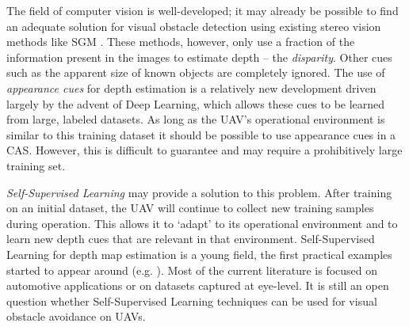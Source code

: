 \medskip

The field of computer vision is well-developed; it may already be possible to find an adequate solution for visual obstacle detection using existing stereo vision methods like \ac{SGM} \cite{Hirschmuller2008}.
These methods, however, only use a fraction of the information present in the images to estimate depth -- the \emph{disparity}.
Other cues such as the apparent size of known objects are completely ignored.
The use of \emph{appearance cues} for depth estimation is a relatively new development driven largely by the advent of Deep Learning, which allows these cues to be learned from large, labeled datasets.
As long as the \ac{UAV}'s operational environment is similar to this training dataset it should be possible to use appearance cues in a \ac{CAS}.
However, this is difficult to guarantee and may require a prohibitively large training set.

\emph{Self-Supervised Learning} may provide a solution to this problem.
After training on an initial dataset, the \ac{UAV} will continue to collect new training samples during operation.
This allows it to `adapt' to its operational environment and to learn new depth cues that are relevant in that environment.
Self-Supervised Learning for depth map estimation is a young field, the first practical examples started to appear around \citeyear{Garg2016} (e.g. \cite{Garg2016}).
Most of the current literature is focused on automotive applications or on datasets captured at eye-level.
It is still an open question whether Self-Supervised Learning techniques can be used for visual obstacle avoidance on \acp{UAV}.

